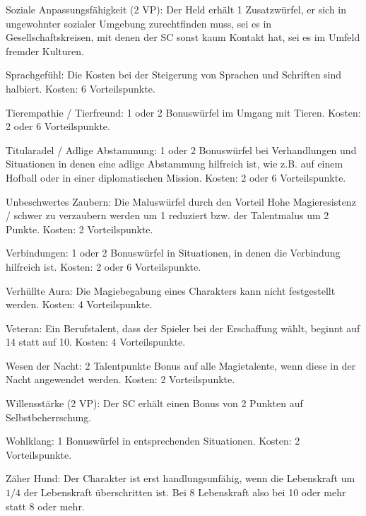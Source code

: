 \begin{description}
\item{Soziale Anpassungsfähigkeit (2 VP):} Der Held erhält 1 Zusatzwürfel, er sich in ungewohnter sozialer Umgebung zurechtfinden muss, sei es in Gesellschaftskreisen, mit denen der SC sonst kaum Kontakt hat, sei es im Umfeld fremder Kulturen.

\item{Sprachgefühl:} Die Kosten bei der Steigerung von Sprachen und Schriften sind halbiert. Kosten: 6 Vorteilspunkte.

\item{Tierempathie / Tierfreund:} 1 oder 2 Bonuswürfel im Umgang mit Tieren. Kosten: 2 oder 6 Vorteilspunkte.

\item{Titularadel / Adlige Abstammung:} 1 oder 2 Bonuswürfel bei Verhandlungen und Situationen in denen eine adlige Abstammung hilfreich ist, wie z.B. auf einem Hofball oder in einer diplomatischen Mission. Kosten: 2 oder 6 Vorteilspunkte.

\item{Unbeschwertes Zaubern:} Die Maluswürfel durch den Vorteil Hohe Magieresistenz / schwer zu verzaubern werden um 1 reduziert bzw. der Talentmalus um 2 Punkte. Kosten: 2 Vorteilspunkte.

\item{Verbindungen:} 1 oder 2 Bonuswürfel in Situationen, in denen die Verbindung hilfreich ist. Kosten: 2 oder 6 Vorteilspunkte.

\item{Verhüllte Aura:} Die Magiebegabung eines Charakters kann nicht festgestellt werden. Kosten: 4 Vorteilspunkte.

\item{Veteran:} Ein Berufstalent, dass der Spieler bei der Erschaffung wählt, beginnt auf 14 statt auf 10. Kosten: 4 Vorteilspunkte.

\item{Wesen der Nacht:} 2 Talentpunkte Bonus auf alle Magietalente, wenn diese in der Nacht angewendet werden. Kosten: 2 Vorteilspunkte.

\item{Willensstärke (2 VP):} Der SC erhält einen Bonus von 2 Punkten auf Selbstbeherrschung.

\item{Wohlklang:} 1 Bonuswürfel in entsprechenden Situationen. Kosten: 2 Vorteilspunkte.

\item{Zäher Hund:} Der Charakter ist erst handlungsunfähig, wenn die Lebenskraft um $1/4$ der Lebenskraft überschritten ist. Bei 8 Lebenskraft also bei 10 oder mehr statt 8 oder mehr.


\end{description}
